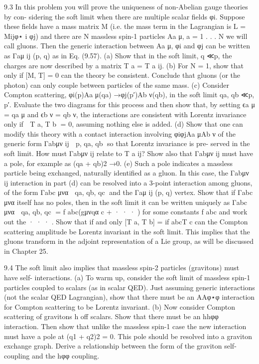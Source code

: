9.3 In this problem you will prove the uniqueness of non-Abelian gauge theories by con-
sidering the soft limit when there are multiple scalar ﬁelds φi. Suppose these ﬁelds
have a mass matrix M (i.e. the mass term in the Lagrangian is L = Mijφ⋆
i φj) and
there are N massless spin-1 particles Aa
μ, a = 1 . . . N we will call gluons. Then the
generic interaction between Aa
μ, φi and φj can be written as Γaμ
ij (p, q) as in Eq. (9.57).
(a) Show that in the soft limit, q ≪p, the charges are now described by a matrix
T a = T a
ij.
(b) For N = 1, show that only if [M, T] = 0 can the theory be consistent. Conclude
that gluons (or the photon) can only couple between particles of the same mass.
(c) Consider Compton scattering, φi(p)Aa
μ(qa) →φj(p′)Ab
ν(qb), in the soft limit
qa, qb ≪p, p′. Evaluate the two diagrams for this process and then show that,
by setting ϵa
μ = qa
μ and ϵb
ν = qb
ν, the interactions are consistent with Lorentz
invariance only if

T a, T b
= 0, assuming nothing else is added.
(d) Show that one can modify this theory with a contact interaction involving
φiφjAa
μAb
ν of the generic form Γabμν
ij

p, qa, qb
so that Lorentz invariance is pre-
served in the soft limit. How must Γabμν
ij
relate to T a
ij? Show also that Γabμν
ij
must
have a pole, for example as (qa + qb)2 →0.
(e) Such a pole indicates a massless particle being exchanged, naturally identiﬁed
as a gluon. In this case, the Γabμν
ij
interaction in part (d) can be resolved into a
3-point interaction among gluons, of the form Γabc
μνα

qa, qb, qc
and the Γaμ
ij (p, q)
vertex. Show that if Γabc
μνα itself has no poles, then in the soft limit it can be written
uniquely as Γabc
μνα

qa, qb, qc
= f abc(gμνqα
c + · · · ) for some constants f abc and
work out the · · · . Show that if and only [T a, T b] = if abcT c can the Compton
scattering amplitude be Lorentz invariant in the soft limit. This implies that the
gluons transform in the adjoint representation of a Lie group, as will be discussed
in Chapter 25.

9.4 The soft limit also implies that massless spin-2 particles (gravitons) must have self-
interactions.
(a) To warm up, consider the soft limit of massless spin-1 particles coupled to
scalars (as in scalar QED). Just assuming generic interactions (not the scalar
QED Lagrangian), show that there must be an AAφ⋆φ interaction for Compton
scattering to be Lorentz invariant.
(b) Now consider Compton scattering of gravitons h off scalars. Show that there must
be an hhφφ interaction. Then show that unlike the massless spin-1 case the new
interaction must have a pole at (q1 + q2)2 = 0. This pole should be resolved into
a graviton exchange graph. Derive a relationship between the form of the graviton
self-coupling and the hφφ coupling.

